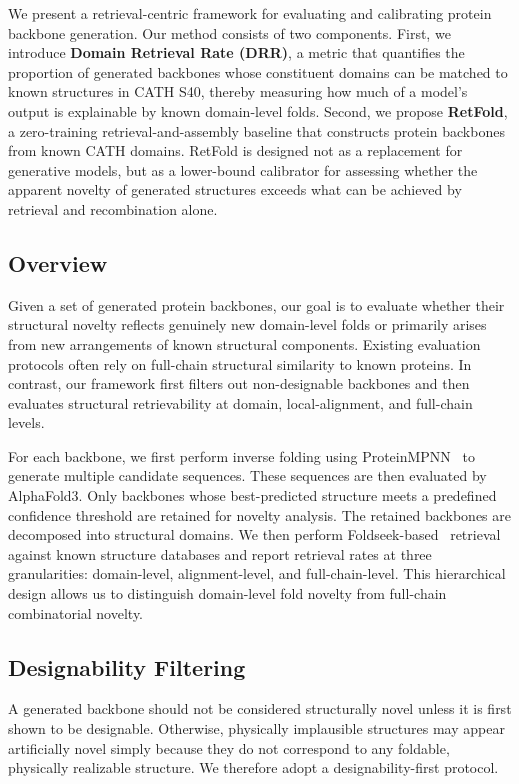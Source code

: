 \documentclass[letterpaper]{article} %
\begin{document}
We present a retrieval-centric framework for evaluating and calibrating protein backbone generation. Our method consists of two components. First, we introduce \textbf{Domain Retrieval Rate (DRR)}, a metric that quantifies the proportion of generated backbones whose constituent domains can be matched to known structures in CATH S40, thereby measuring how much of a model's output is explainable by known domain-level folds. Second, we propose \textbf{RetFold}, a zero-training retrieval-and-assembly baseline that constructs protein backbones from known CATH domains. RetFold is designed not as a replacement for generative models, but as a lower-bound calibrator for assessing whether the apparent novelty of generated structures exceeds what can be achieved by retrieval and recombination alone.

\subsection{Overview}

Given a set of generated protein backbones, our goal is to evaluate whether their structural novelty reflects genuinely new domain-level folds or primarily arises from new arrangements of known structural components. Existing evaluation protocols often rely on full-chain structural similarity to known proteins. In contrast, our framework first filters out non-designable backbones and then evaluates structural retrievability at domain, local-alignment, and full-chain levels.

For each backbone, we first perform inverse folding using ProteinMPNN~\cite{dauparas2022proteinmpnn} to generate multiple candidate sequences. These sequences are then evaluated by AlphaFold3. Only backbones whose best-predicted structure meets a predefined confidence threshold are retained for novelty analysis. The retained backbones are decomposed into structural domains. We then perform Foldseek-based~\citep{vankempen2024foldseek} retrieval against known structure databases and report retrieval rates at three granularities: domain-level, alignment-level, and full-chain-level. This hierarchical design allows us to distinguish domain-level fold novelty from full-chain combinatorial novelty.

\subsection{Designability Filtering}

A generated backbone should not be considered structurally novel unless it is first shown to be designable. Otherwise, physically implausible structures may appear artificially novel simply because they do not correspond to any foldable, physically realizable structure. We therefore adopt a designability-first protocol.
\end{document}
